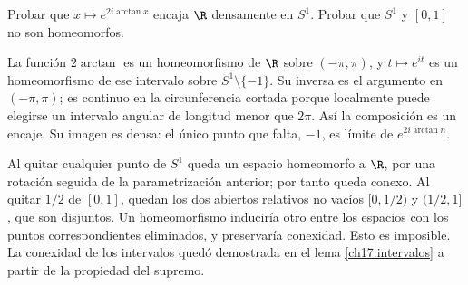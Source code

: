 \begin{ejercicio}\label{ej:lectura-16-1}
Probar que $x\mapsto e^{2i\arctan x}$ encaja $\R$ densamente en $S^1$. Probar que $S^1$ y $[0,1]$ no son homeomorfos.
\end{ejercicio}
\begin{solucion}
La función $2\arctan$ es un homeomorfismo de $\R$ sobre $(-\pi,\pi)$, y $t\mapsto e^{it}$ es un homeomorfismo de ese intervalo sobre $S^1\setminus\{-1\}$. Su inversa es el argumento en $(-\pi,\pi)$; es continuo en la circunferencia cortada porque localmente puede elegirse un intervalo angular de longitud menor que $2\pi$. Así la composición es un encaje. Su imagen es densa: el único punto que falta, $-1$, es límite de $e^{2i\arctan n}$.

Al quitar cualquier punto de $S^1$ queda un espacio homeomorfo a $\R$, por una rotación seguida de la parametrización anterior; por tanto queda conexo. Al quitar $1/2$ de $[0,1]$, quedan los dos abiertos relativos no vacíos $[0,1/2)$ y $(1/2,1]$, que son disjuntos. Un homeomorfismo induciría otro entre los espacios con los puntos correspondientes eliminados, y preservaría conexidad. Esto es imposible. La conexidad de los intervalos quedó demostrada en el lema \ref{ch17:intervalos} a partir de la propiedad del supremo.
\end{solucion}

